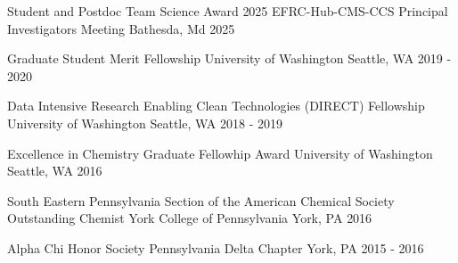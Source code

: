 



\begin{cvhonors}

  \cvhonor
    {Student and Postdoc Team Science Award} %
    {2025 EFRC-Hub-CMS-CCS Principal Investigators Meeting} %
    {Bathesda, Md} %
    {2025} %

  \cvhonor
    {Graduate Student Merit Fellowship} %
    {University of Washington} %
    {Seattle, WA} %
    {2019 - 2020} %

  \cvhonor
    {Data Intensive Research Enabling Clean Technologies (DIRECT) Fellowship} %
    {University of Washington} %
    {Seattle, WA} %
    {2018 - 2019} %


  \cvhonor
    {Excellence in Chemistry Graduate Fellowhip Award} %
    {University of Washington} %
    {Seattle, WA} %
    {2016} %


  \cvhonor
    {South Eastern Pennsylvania Section of the American Chemical Society Outstanding Chemist} %
    {York College of Pennsylvania} %
    {York, PA} %
    {2016} %


  \cvhonor
    {Alpha Chi Honor Society} %
    {Pennsylvania Delta Chapter} %
    {York, PA} %
    {2015 - 2016} %


%
%
%
\end{cvhonors}
